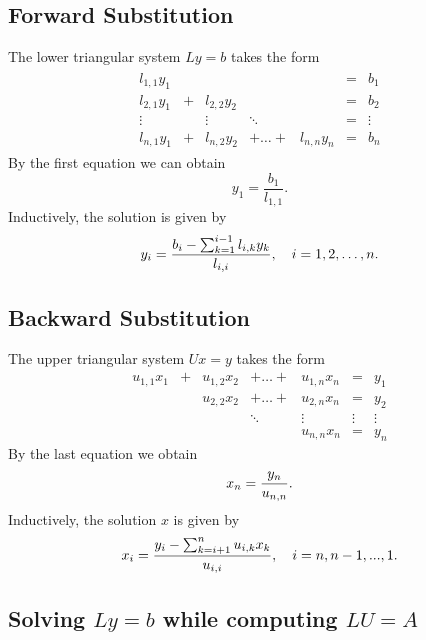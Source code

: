 \documentclass[11pt]{article}
\begin{document}
    \subsection{Forward Substitution}\label{forward-substitution}

The lower triangular system \(L y =b\) takes the form \[\begin{aligned}
\begin{array}{ccccccc}
l_{1,1}y_1 & &           &         &          & =&  b_1    \\
l_{2,1}y_1 &+&l_{2,2}y_2    &         &          & =&  b_2    \\
\vdots     & &\vdots     & \ddots  &          & =&  \vdots \\
l_{n,1}y_1 &+&l_{n,2}y_2 &+ \ldots +&l_{n,n}y_n&    =& b_n
\end{array}\end{aligned}\] By the first equation we can obtain
\[y_1 = \frac{b_1}{l_{1,1}}.\] Inductively, the solution is given by
\[y_i = {{b_i - \sum_{k=1}^{i-1} l_{i,k} y_k } \over l_{i,i}}, \quad
i = 1, 2, \ldots , n.\]

    \subsection{Backward Substitution}\label{backward-substitution}

The upper triangular system \(Ux = y\) takes the form
\[\begin{array}{ccccccc}
u_{1,1}x_1 &+&u_{1,2}x_2  &+ \ldots +&u_{1,n}x_n  &=  &y_1 \\
           & &u_{2,2}x_2  &+ \ldots +&u_{2,n}x_n  &=  &y_2 \\
           & &            & \ddots   & \vdots   &\vdots &\vdots \\
           & &            &          &  u_{n,n}x_n&=   &y_n
\end{array}\] By the last equation we obtain
\[x_n = { y_n \over u_{n,n}}.\] Inductively, the solution \(x\) is given
by \[x_i = {{y_i - \sum_{k=i+1}^n u_{i,k} x_k } \over u_{i,i}}, \quad
 i = n, n-1,..., 1.\]

    \subsection{\texorpdfstring{Solving \(Ly = b\) while computing
\(LU=A\)}{Solving Ly = b while computing LU=A}}\label{solving-ly-b-while-computing-lua}
\end{document}
